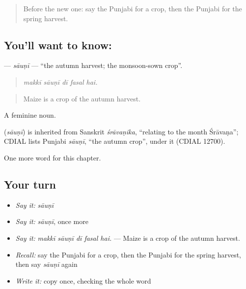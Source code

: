 \begin{quote}
Before the new one: say the Punjabi for a crop, then the Punjabi for the spring harvest.
\end{quote}

\subsection*{You'll want to know: }
\textbf{} — \emph{sāuṇī} — \textquotedblleft{}the autumn harvest; the monsoon-sown crop\textquotedblright{}.

\begin{quote}
    
\end{quote}

\begin{quote}
\emph{makkī sāuṇī dī fasal hai.}
\end{quote}

\begin{quote}
Maize is a crop of the autumn harvest.
\end{quote}

A feminine noun.

\begin{cousinweb}
\textbf{} (\emph{sāuṇī}) is inherited from Sanskrit \emph{śrāvaṇika}, \textquotedblleft{}relating to the month Śrāvaṇa\textquotedblright{}; CDIAL lists Punjabi \emph{sāuṇī}, \textquotedblleft{}the autumn crop\textquotedblright{}, under it (CDIAL 12700).
\end{cousinweb}

\begin{grammarlens}[title={What you've built}]
One more word for this chapter.
\end{grammarlens}

\subsection*{Your turn}
\begin{itemize}
\raggedright
  \item \emph{Say it:} \emph{sāuṇī}
  \item \emph{Say it:} \emph{sāuṇī}, once more
  \item \emph{Say it:} \emph{makkī sāuṇī dī fasal hai.} — Maize is a crop of the autumn harvest.
  \item \emph{Recall:} say the Punjabi for a crop, then the Punjabi for the spring harvest, then say \emph{sāuṇī} again
  \item \emph{Write it:} copy \textbf{} once, checking the whole word
\end{itemize}

